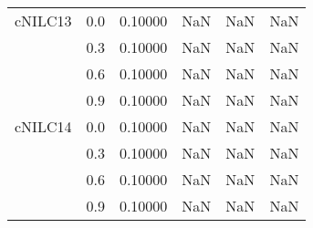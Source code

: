 \begin{longtable}{cccccc}
cNILC13 & 0.0 & 0.10000 & NaN & NaN & NaN \\
        & 0.3 & 0.10000 & NaN & NaN & NaN \\
        & 0.6 & 0.10000 & NaN & NaN & NaN \\
        & 0.9 & 0.10000 & NaN & NaN & NaN \\
cNILC14 & 0.0 & 0.10000 & NaN & NaN & NaN \\
        & 0.3 & 0.10000 & NaN & NaN & NaN \\
        & 0.6 & 0.10000 & NaN & NaN & NaN \\
        & 0.9 & 0.10000 & NaN & NaN & NaN \\
\end{longtable}
